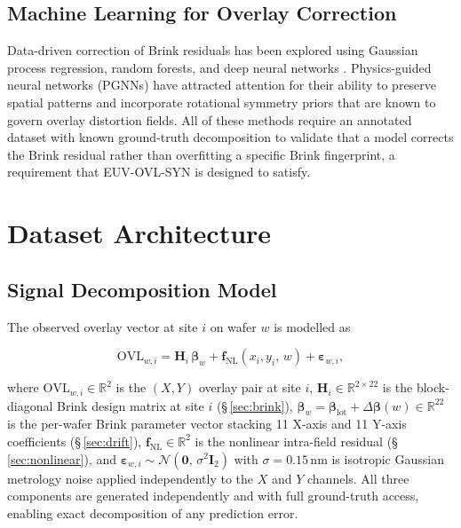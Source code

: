 \documentclass[10pt,conference]{IEEEtran}
\begin{document}
\subsection{Machine Learning for Overlay Correction}

Data-driven correction of Brink residuals has been explored using Gaussian
process regression, random forests, and deep neural networks
\cite{smith2018, abbe2019, kim2020, rui2025}.  Physics-guided neural networks
(PGNNs) \cite{raissi2019, guerrero2025} have attracted attention for their ability to
preserve spatial patterns and incorporate rotational symmetry priors that are known to
govern overlay distortion fields.  All of these methods require an annotated
dataset with known ground-truth decomposition to validate that a model
corrects the Brink residual rather than overfitting a specific Brink fingerprint, 
a requirement that \textsc{EUV-OVL-SYN} is designed to satisfy.

\section{Dataset Architecture}

\subsection{Signal Decomposition Model}

The observed overlay vector at site $i$ on wafer $w$ is modelled as

\begin{equation}
  \mathrm{OVL}_{w,i}
  = \mathbf{H}_i\,\bm{\beta}_w
  + \mathbf{f}_{\mathrm{NL}}(x_i, y_i,\, w)
  + \bm{\varepsilon}_{w,i},
  \label{eq:signal}
\end{equation}

\noindent where $\mathrm{OVL}_{w,i} \in \mathbb{R}^{2}$ is the $(X,Y)$
overlay pair at site $i$,
$\mathbf{H}_i \in \mathbb{R}^{2\times 22}$ is the block-diagonal Brink
design matrix at site $i$ (§\,\ref{sec:brink}),
$\bm{\beta}_w = \bm{\beta}_{\text{lot}} + \Delta\bm{\beta}(w) \in \mathbb{R}^{22}$
is the per-wafer Brink parameter vector stacking 11 X-axis and 11 Y-axis
coefficients (§\,\ref{sec:drift}),
$\mathbf{f}_{\mathrm{NL}} \in \mathbb{R}^{2}$ is the nonlinear intra-field
residual (§\,\ref{sec:nonlinear}), and
$\bm{\varepsilon}_{w,i} \sim \mathcal{N}(\mathbf{0},\,\sigma^2\mathbf{I}_2)$
with $\sigma\!=\!0.15$\,nm is isotropic Gaussian metrology noise applied
independently to the $X$ and $Y$ channels.
All three components are generated independently and with full ground-truth
access, enabling exact decomposition of any prediction error.
\end{document}
